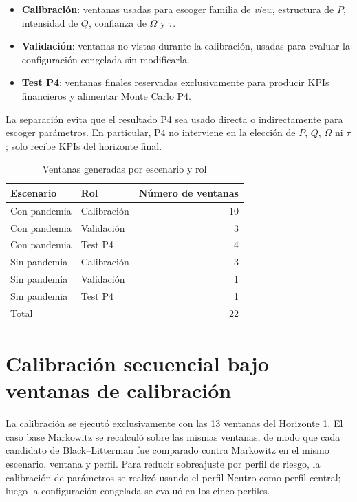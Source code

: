 \documentclass[11pt]{article}
\begin{document}
\begin{itemize}
    \item \textbf{Calibraci\'on}: ventanas usadas para escoger familia de \textit{view}, estructura de $P$, intensidad de $Q$, confianza de $\Omega$ y $\tau$.
    \item \textbf{Validaci\'on}: ventanas no vistas durante la calibraci\'on, usadas para evaluar la configuraci\'on congelada sin modificarla.
    \item \textbf{Test P4}: ventanas finales reservadas exclusivamente para producir KPIs financieros y alimentar Monte Carlo P4.
\end{itemize}

La separaci\'on evita que el resultado P4 sea usado directa o indirectamente para escoger par\'ametros. En particular, P4 no interviene en la elecci\'on de $P$, $Q$, $\Omega$ ni $\tau$; solo recibe KPIs del horizonte final.

\begin{table}[H]
\centering
\caption{Ventanas generadas por escenario y rol}
\label{tab:ventanas}
\begin{tabular}{l l r}
\toprule
Escenario & Rol & N\'umero de ventanas \\
\midrule
Con pandemia & Calibraci\'on & 10 \\
Con pandemia & Validaci\'on & 3 \\
Con pandemia & Test P4 & 4 \\
Sin pandemia & Calibraci\'on & 3 \\
Sin pandemia & Validaci\'on & 1 \\
Sin pandemia & Test P4 & 1 \\
\midrule
Total & & 22 \\
\bottomrule
\end{tabular}
\end{table}

\section{Calibraci\'on secuencial bajo ventanas de calibraci\'on}

La calibraci\'on se ejecut\'o exclusivamente con las 13 ventanas del Horizonte 1. El caso base Markowitz se recalcul\'o sobre las mismas ventanas, de modo que cada candidato de Black--Litterman fue comparado contra Markowitz en el mismo escenario, ventana y perfil. Para reducir sobreajuste por perfil de riesgo, la calibraci\'on de par\'ametros se realiz\'o usando el perfil Neutro como perfil central; luego la configuraci\'on congelada se evalu\'o en los cinco perfiles.
\end{document}
